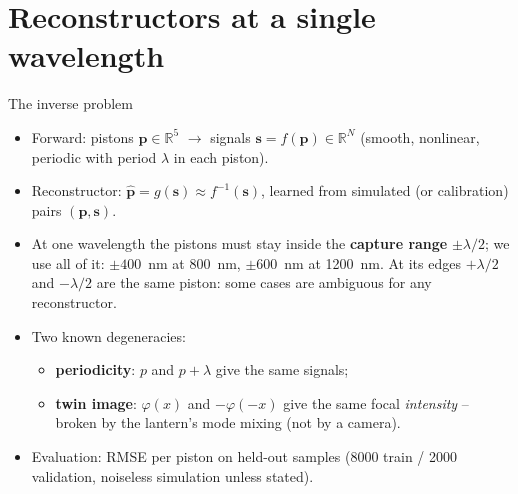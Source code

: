 \documentclass[aspectratio=169,10pt]{beamer}
\begin{document}
\section{Reconstructors at a single wavelength}
\begin{frame}{The inverse problem}
\begin{itemize}
    \item Forward: pistons $\mathbf p \in \mathbb R^5$ $\to$ signals $\mathbf s = f(\mathbf p) \in \mathbb R^N$
          (smooth, nonlinear, periodic with period $\lambda$ in each piston).
    \item Reconstructor: $\hat{\mathbf p} = g(\mathbf s) \approx f^{-1}(\mathbf s)$, learned from
          simulated (or calibration) pairs $(\mathbf p, \mathbf s)$.
    \item At one wavelength the pistons must stay inside the \textbf{capture range}
          $\pm\lambda/2$; we use all of it: $\pm 400$~nm at 800~nm, $\pm 600$~nm at 1200~nm.
          At its edges $+\lambda/2$ and $-\lambda/2$ are the same piston: some cases are
          ambiguous for any reconstructor.
    \item Two known degeneracies:
    \begin{itemize}
        \item \textbf{periodicity}: $p$ and $p+\lambda$ give the same signals;
        \item \textbf{twin image}: $\varphi(x)$ and $-\varphi(-x)$ give the same focal
              \emph{intensity} -- broken by the lantern's mode mixing (not by a camera).
    \end{itemize}
    \item Evaluation: RMSE per piston on held-out samples (8000 train / 2000 validation,
          noiseless simulation unless stated).
\end{itemize}
\end{frame}
\end{document}
